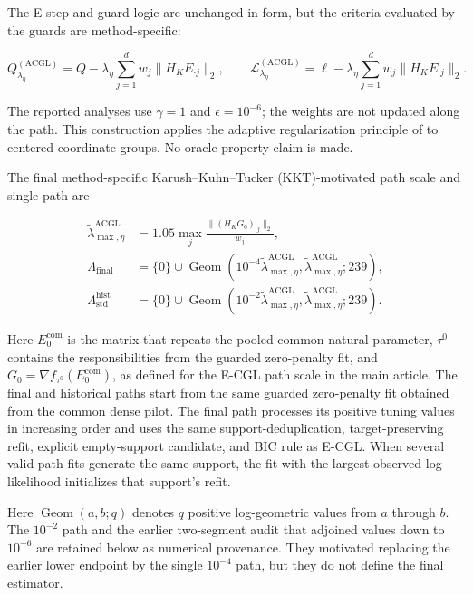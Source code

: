 \documentclass[preprint,12pt,authoryear]{elsarticle}
\begin{document}
The E-step and guard logic are unchanged in form, but the criteria evaluated
by the guards are method-specific:

\[
Q_{\lambda_\eta}^{(\mathrm{ACGL})}
=Q-\lambda_\eta\sum_{j=1}^d
w_j\lVert H_KE_{\cdot j}\rVert_2,
\qquad
\mathcal L_{\lambda_\eta}^{(\mathrm{ACGL})}
=\ell-\lambda_\eta\sum_{j=1}^d
w_j\lVert H_KE_{\cdot j}\rVert_2.
\]

The reported analyses use $\gamma=1$ and $\epsilon=10^{-6}$; the weights are
not updated along the path. This construction applies the adaptive
regularization principle of \citet{zou2006adaptive} to centered coordinate
groups. No oracle-property claim is made.

The final method-specific Karush--Kuhn--Tucker (KKT)-motivated path scale and
single path are

\begin{equation}
\label{eq:supp-eacgl-paths}
\begin{aligned}
\widetilde\lambda_{\max,\eta}^{\mathrm{ACGL}}
&=1.05\max_j
\frac{\lVert(H_KG_0)_{\cdot j}\rVert_2}{w_j},\\
\Lambda_{\mathrm{final}}
&=\{0\}\cup
\operatorname{Geom}
\left(10^{-4}\widetilde\lambda_{\max,\eta}^{\mathrm{ACGL}},
\widetilde\lambda_{\max,\eta}^{\mathrm{ACGL}};239\right),\\
\Lambda_{\mathrm{std}}^{\mathrm{hist}}
&=\{0\}\cup
\operatorname{Geom}
\left(10^{-2}\widetilde\lambda_{\max,\eta}^{\mathrm{ACGL}},
\widetilde\lambda_{\max,\eta}^{\mathrm{ACGL}};239\right).
\end{aligned}
\end{equation}

Here $E_0^{\mathrm{com}}$ is the matrix that repeats the pooled common natural
parameter, $\tau^0$ contains the responsibilities from the guarded zero-penalty
fit, and $G_0=\nabla f_{\tau^0}(E_0^{\mathrm{com}})$, as defined for the E-CGL
path scale in the main article. The final and
historical paths start from the same guarded zero-penalty fit obtained from
the common dense pilot. The final path processes its positive
tuning values in increasing order and uses the same support-deduplication,
target-preserving refit, explicit empty-support candidate, and BIC rule as
E-CGL. When several valid path fits generate the same support, the fit with
the largest observed log-likelihood initializes that support's refit.

Here $\operatorname{Geom}(a,b;q)$ denotes $q$ positive log-geometric values
from $a$ through $b$. The $10^{-2}$ path and the earlier two-segment audit that
adjoined values down to $10^{-6}$ are retained below as numerical provenance.
They motivated replacing the earlier lower endpoint by the single
$10^{-4}$ path, but they do not define the final estimator.
\end{document}
